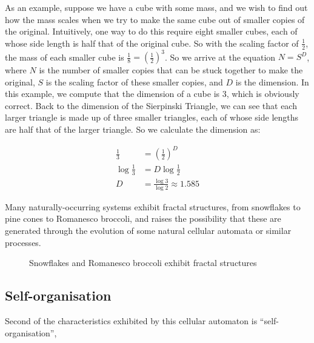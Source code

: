 \documentclass[11pt,a4paper]{article}
\begin{document}
    As an example, suppose we have a cube with some mass, and we wish to find
    out how the mass scales when we try to make the same cube out of smaller
    copies of the original. Intuitively, one way to do this require eight
    smaller cubes, each of whose side length is half that of the original cube.
    So with the scaling factor of $\frac{1}{2}$, the mass of each smaller cube
    is $\frac{1}{8} = (\frac{1}{2})^3$.
    So we arrive at the equation $N = S^D$, where $N$ is the number of smaller
    copies that can be stuck together to make the original, $S$ is the scaling
    factor of these smaller copies, and $D$ is the dimension. In this example, we
    compute that the dimension of a cube is 3, which is obviously correct.  Back
    to the dimension of the Sierpinski Triangle, we can see that each larger
    triangle is made up of three smaller triangles, each of whose side lengths
    are half that of the larger triangle. So we calculate the dimension as:

    \begin{equation}
        \label{sierpinskiDim}
        \begin{split}
            \tfrac{1}{3} & = (\tfrac{1}{2})^D \\
            \log{\tfrac{1}{3}} &= D \log{\tfrac{1}{2}} \\
            D &= \tfrac{\log{3}}{\log{2}} \approx 1.585
        \end{split}
    \end{equation}

    Many naturally-occurring systems exhibit fractal structures, from snowflakes
    to pine cones to Romanesco broccoli, and raises the possibility that these
    are generated through the evolution of some natural cellular automata or
    similar processes.

    \begin{figure}[h]%
        \centering
        \qquad
        \caption{Snowflakes and Romanesco broccoli exhibit fractal structures}%
        \label{fig:nature_fractals}%
    \end{figure}

    \subsection{Self-organisation}
    Second of the characteristics exhibited by this cellular automaton is
    ``self-organisation'', 
\end{document}
